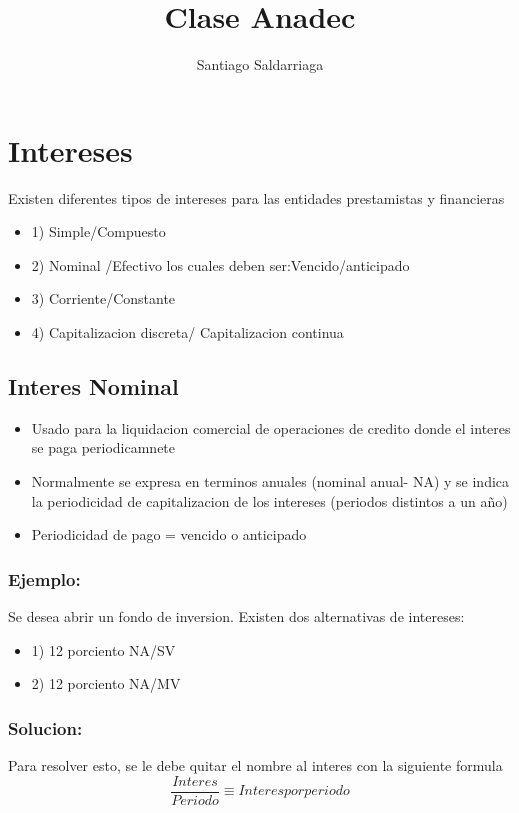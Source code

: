 \documentclass[12pt]{article}
\author{Santiago Saldarriaga}
\title{Clase Anadec}
\begin{document}
\maketitle

\section{Intereses}
Existen diferentes tipos de intereses para las entidades prestamistas y financieras
\begin{itemize}
 \item{1)} Simple/Compuesto
 \item{2)} Nominal /Efectivo los cuales deben ser:Vencido/anticipado
 \item{3)} Corriente/Constante
 \item{4)} Capitalizacion discreta/ Capitalizacion continua
\end{itemize}
\subsection{Interes Nominal}
\begin{itemize}
 \item Usado para la liquidacion comercial de operaciones de credito donde el interes se paga periodicamnete
 \item Normalmente se expresa en terminos anuales (nominal anual- NA) y se indica la periodicidad de capitalizacion de los intereses (periodos distintos a un año)
 \item Periodicidad de pago = vencido o anticipado
\end{itemize}
\subsubsection{Ejemplo:}
Se desea abrir un fondo de inversion. Existen dos alternativas de intereses:
\begin{itemize}
 \item{1)} 12 porciento NA/SV
 \item{2)} 12 porciento NA/MV
\end{itemize}
\subsubsection{Solucion:}
Para resolver esto, se le debe quitar el nombre al interes con la siguiente formula
\begin{equation}
 \dfrac {Interes}{Periodo} \equiv Interes por periodo  
\end{equation}
\end{document}
